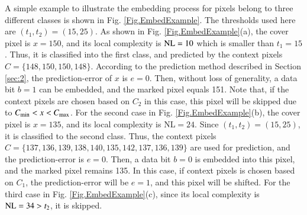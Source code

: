 \documentclass[review,3p,10pt,sort&compress]{elsarticle}
\begin{document}
A simple example to illustrate the embedding process for pixels belong to three different classes is shown in Fig. \ref{Fig.EmbedExample}. The thresholds used here are $(t_1, t_2) = (15, 25)$. As shown in Fig. \ref{Fig.EmbedExample}(a), the cover pixel is $x = 150$, and its local complexity is ${\rm NL} = 10$ which is smaller than $t_1=15$. Thus, it is classified into the first class, and predicted by the context pixels $C = \{148, 150, 150, 148\}$. According to the prediction method described in Section \ref{sec:2}, the prediction-error of $x$ is $e=0$. Then, without loss of generality, a data bit $b=1$ can be embedded, and the marked pixel equals 151. Note that, if the context pixels are chosen based on $C_2$ in this case, this pixel will be skipped due to $C_{\rm min}<x<C_{\rm max}$. For the second case in Fig. \ref{Fig.EmbedExample}(b), the cover pixel is $x=135$, and its local complexity is NL$=24$. Since $(t_1, t_2) = (15, 25)$, it is classified to the second class. Thus, the context pixels $C = \{137, 136, 139, 138, 140, 135, 142, 137, 136, 139\}$ are used for prediction, and the prediction-error is $e = 0$. Then, a data bit $b = 0$ is embedded into this pixel, and the marked pixel remains 135. In this case, if context pixels is chosen based on $C_1$, the prediction-error will be $e=1$, and this pixel will be shifted. For the third case in Fig. \ref{Fig.EmbedExample}(c), since its local complexity is ${\rm NL} = 34>t_2$, it is skipped.

\end{document}
